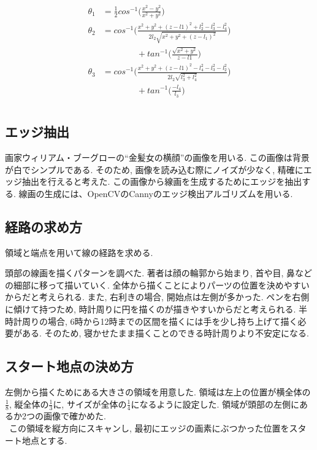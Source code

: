\documentclass[10pt]{jarticle}
\begin{document}
	\begin{equation}
		\begin{array}{c}
			\begin{split}
				\theta_1  &  =\frac{1}{2}  cos^{-1}\biggl( \frac{x^2-y^2}{x^2+y^2} \biggr) \\
				\theta_2  &  = cos^{-1}\biggl( \frac{x^2+y^2+(z-l1)^2  +  l_2^2-l_3^2-l_4^2}{2l_2\sqrt{x^2+y^2+(z-l_1)^2}} \biggr)\\
				&\qquad\qquad  +  tan^{-1}\biggl( \frac{\sqrt{x^2+y^2}}{z-l1}\biggr) \\
				\theta_3  &  =cos^{-1}\biggl( \frac{x^2+y^2+(z-l1)^2 - l_4^2-l_3^2-l_2^2}{2l_2\sqrt{l_3^2+l_4^2}}\biggr)\\
				&\qquad\qquad + tan^{-1}\biggl( \frac{-l_4}{l_3}\biggr)\\
			\end{split}
		\end{array}
	\end{equation}
	
	\normalsize

	\subsection{エッジ抽出}
	画家ウィリアム・ブーグローの``金髪女の横顔''の画像を用いる.
	この画像は背景が白でシンプルである. そのため, 画像を読み込む際にノイズが少なく, 精確にエッジ抽出を行えると考えた.
	この画像から線画を生成するためにエッジを抽出する.
	線画の生成には、OpenCVのCannyのエッジ検出アルゴリズムを用いる.
	
	
	\subsection{経路の求め方}
	領域と端点を用いて線の経路を求める.

	頭部の線画を描くパターンを調べた.
	著者は顔の輪郭から始まり, 首や目, 鼻などの細部に移って描いていく.
	全体から描くことによりパーツの位置を決めやすいからだと考えられる.
	また, 右利きの場合, 開始点は左側が多かった.
	ペンを右側に傾けて持つため, 時計周りに円を描くのが描きやすいからだと考えられる.
	半時計周りの場合, 6時から12時までの区間を描くには手を少し持ち上げて描く必要がある.
    そのため, 寝かせたまま描くことのできる時計周りより不安定になる.
	
	\subsection{スタート地点の決め方}

	左側から描くためにある大きさの領域を用意した.
	領域は左上の位置が横全体の$\frac{1}{8}$, 縦全体の$\frac{1}{3}$に, サイズが全体の$\frac{1}{4}$になるように設定した.
	領域が頭部の左側にあるか2つの画像で確かめた.
	\\\ この領域を縦方向にスキャンし, 最初にエッジの画素にぶつかった位置をスタート地点とする.
\end{document}
